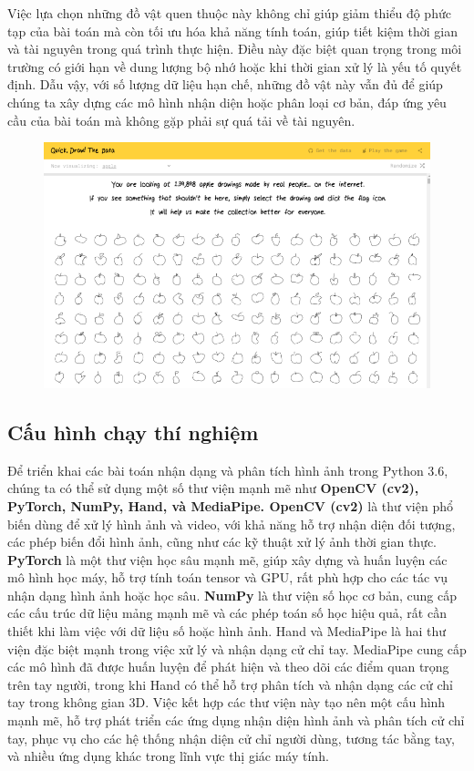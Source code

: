 \begin{itemize}
Việc lựa chọn những đồ vật quen thuộc này không chỉ giúp giảm thiểu độ phức tạp của bài toán mà còn tối ưu hóa khả năng tính toán, giúp tiết kiệm thời gian và tài nguyên trong quá trình thực hiện. Điều này đặc biệt quan trọng trong môi trường có giới hạn về dung lượng bộ nhớ hoặc khi thời gian xử lý là yếu tố quyết định. Dẫu vậy, với số lượng dữ liệu hạn chế, những đồ vật này vẫn đủ để giúp chúng ta xây dựng các mô hình nhận diện hoặc phân loại cơ bản, đáp ứng yêu cầu của bài toán mà không gặp phải sự quá tải về tài nguyên.

\begin{figure}[H]  %
\centering
\includegraphics[width=0.75\linewidth]{Chapter2/QD1.png}
\label{fig:baitoan}
\end{figure}

\subsection{Cấu hình chạy thí nghiệm}

Để triển khai các bài toán nhận dạng và phân tích hình ảnh trong Python 3.6, chúng ta có thể sử dụng một số thư viện mạnh mẽ như \textbf{OpenCV (cv2), PyTorch, NumPy, Hand, và MediaPipe. OpenCV (cv2)} là thư viện phổ biến dùng để xử lý hình ảnh và video, với khả năng hỗ trợ nhận diện đối tượng, các phép biến đổi hình ảnh, cũng như các kỹ thuật xử lý ảnh thời gian thực. \textbf{PyTorch} là một thư viện học sâu mạnh mẽ, giúp xây dựng và huấn luyện các mô hình học máy, hỗ trợ tính toán tensor và GPU, rất phù hợp cho các tác vụ nhận dạng hình ảnh hoặc học sâu. \textbf{NumPy} là thư viện số học cơ bản, cung cấp các cấu trúc dữ liệu mảng mạnh mẽ và các phép toán số học hiệu quả, rất cần thiết khi làm việc với dữ liệu số hoặc hình ảnh. Hand và MediaPipe là hai thư viện đặc biệt mạnh trong việc xử lý và nhận dạng cử chỉ tay. MediaPipe cung cấp các mô hình đã được huấn luyện để phát hiện và theo dõi các điểm quan trọng trên tay người, trong khi Hand có thể hỗ trợ phân tích và nhận dạng các cử chỉ tay trong không gian 3D. Việc kết hợp các thư viện này tạo nên một cấu hình mạnh mẽ, hỗ trợ phát triển các ứng dụng nhận diện hình ảnh và phân tích cử chỉ tay, phục vụ cho các hệ thống nhận diện cử chỉ người dùng, tương tác bằng tay, và nhiều ứng dụng khác trong lĩnh vực thị giác máy tính.


\end{itemize}
